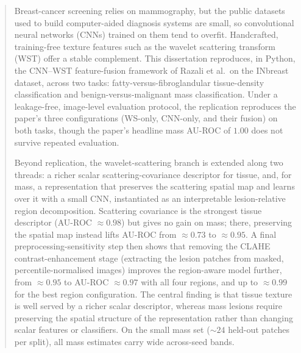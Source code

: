 \begin{abstract}
Breast-cancer screening relies on mammography, but the public datasets used to build computer-aided diagnosis systems are small, so convolutional neural networks (CNNs) trained on them tend to overfit. Handcrafted, training-free texture features such as the wavelet scattering transform (WST) offer a stable complement. This dissertation reproduces, in Python, the CNN--WST feature-fusion framework of Razali et al.\ on the INbreast dataset, across two tasks: fatty-versus-fibroglandular tissue-density classification and benign-versus-malignant mass classification. Under a leakage-free, image-level evaluation protocol, the replication reproduces the paper's three configurations (WS-only, CNN-only, and their fusion) on both tasks, though the paper's headline mass AU-ROC of $1.00$ does not survive repeated evaluation.

Beyond replication, the wavelet-scattering branch is extended along two threads: a richer scalar scattering-covariance descriptor for tissue, and, for mass, a representation that preserves the scattering spatial map and learns over it with a small CNN, instantiated as an interpretable lesion-relative region decomposition. Scattering covariance is the strongest tissue descriptor (AU-ROC ${\approx}0.98$) but gives no gain on mass; there, preserving the spatial map instead lifts AU-ROC from ${\approx}0.73$ to ${\approx}0.95$. A final preprocessing-sensitivity step then shows that removing the CLAHE contrast-enhancement stage (extracting the lesion patches from masked, percentile-normalised images) improves the region-aware model further, from ${\approx}0.95$ to AU-ROC ${\approx}0.97$ with all four regions, and up to ${\approx}0.99$ for the best region configuration. The central finding is that tissue texture is well served by a richer scalar descriptor, whereas mass lesions require preserving the spatial structure of the representation rather than changing scalar features or classifiers. On the small mass set (${\sim}24$ held-out patches per split), all mass estimates carry wide across-seed bands.
\end{abstract}
